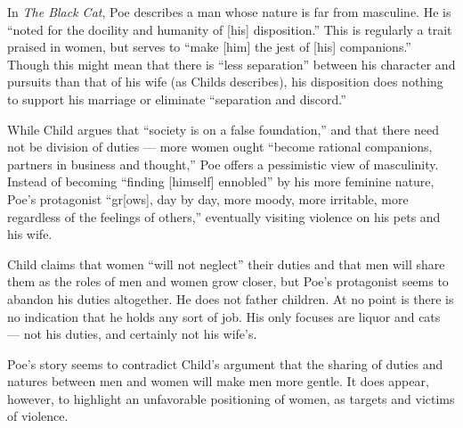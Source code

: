 \documentclass[man,12pt,natbib]{apa6}
\begin{document}
In \emph{The Black Cat}, Poe describes a man whose nature is far from
masculine. He is ``noted for the docility and humanity of [his] disposition.''
This is regularly a trait praised in women, but serves to ``make [him] the jest
of [his] companions.'' Though this might mean that there is ``less separation''
between his character and pursuits than that of his wife (as Childs describes),
his disposition does nothing to support his marriage or eliminate ``separation
and discord.''

While Child argues that ``society is on a false foundation,'' and that there
need not be division of duties --- more women ought ``become rational
companions, partners in business and thought,'' Poe offers a pessimistic view
of masculinity. Instead of becoming ``finding [himself] ennobled'' by his more
feminine nature, Poe's protagonist ``gr[ows], day by day, more moody, more
irritable, more regardless of the feelings of others,'' eventually visiting
violence on his pets and his wife.

Child claims that women ``will not neglect'' their duties and that men will
share them as the roles of men and women grow closer, but Poe's protagonist
seems to abandon his duties altogether.  He does not father children. At no
point is there is no indication that he holds any sort of job. His only focuses
are liquor and cats --- not his duties, and certainly not his wife's.

Poe's story seems to contradict Child's argument that the sharing of duties and
natures between men and women will make men more gentle. It does appear,
however, to highlight an unfavorable positioning of women, as targets and
victims of violence.

\nocite{Child12b, Melville12, Poe12b}

\clearpage

\end{document}
